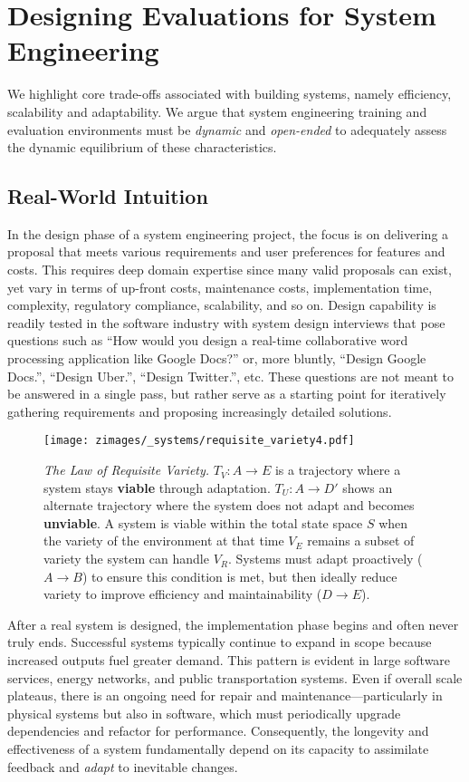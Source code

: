 \section{Designing Evaluations for System Engineering}
We highlight core trade-offs associated with building systems, namely efficiency, scalability and adaptability. We argue that system engineering training and evaluation environments must be \textit{dynamic} and \textit{open-ended} to adequately assess the dynamic equilibrium of these characteristics.

\subsection{Real-World Intuition}
In the design phase of a system engineering project, the focus is on delivering a proposal that meets various requirements and user preferences for features and costs. This requires deep domain expertise since many valid proposals can exist, yet vary in terms of up-front costs, maintenance costs, implementation time, complexity, regulatory compliance, scalability, and so on. Design capability is readily tested in the software industry with system design interviews that pose questions such as “How would you design a real-time collaborative word processing application like Google Docs?” or, more bluntly, “Design Google Docs.”, “Design Uber.”, “Design Twitter.”, etc. These questions are not meant to be answered in a single pass, but rather serve as a starting point for iteratively gathering requirements and proposing increasingly detailed solutions.

\begin{figure}[ht]
    \centering
    \texttt{[image: zimages/\_systems/requisite\_variety4.pdf]}
    \caption{\textit{The Law of Requisite Variety.} $T_V: A \rightarrow E$ is a trajectory where a system stays \textbf{viable} through adaptation. $T_U: A \rightarrow D\prime$ shows an alternate trajectory where the system does not adapt and becomes \textbf{unviable}. A system is viable within the total state space $S$ when the variety of the environment at that time $V_E$ remains a subset of variety the system can handle $V_R$. Systems must adapt proactively ($A \rightarrow B$) to ensure this condition is met, but then ideally reduce variety to improve efficiency and maintainability ($D\rightarrow E$).}
    \label{fig:requisite_variety}
\end{figure}

After a real system is designed, the implementation phase begins and often never truly ends. Successful systems typically continue to expand in scope because increased outputs fuel greater demand. This pattern is evident in large software services, energy networks, and public transportation systems. Even if overall scale plateaus, there is an ongoing need for repair and maintenance—particularly in physical systems but also in software, which must periodically upgrade dependencies and refactor for performance. Consequently, the longevity and effectiveness of a system fundamentally depend on its capacity to assimilate feedback and \textit{adapt} to inevitable changes.


